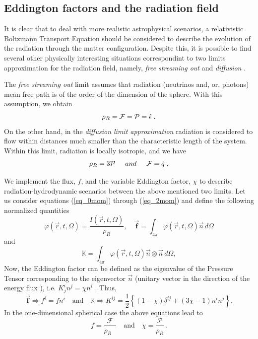 \documentclass[notitlepage,letterpaper, 10pt]{article}
\begin{document}
\subsection{Eddington factors and the radiation field}
It is clear that to deal with more realistic astrophysical scenarios, a relativistic Boltzmann Transport Equation should be considered to describe the evolution of the radiation through the matter configuration\cite{Lindquist1966}.  Despite this, it is possible to find several other physically interesting situations correspondint to two limits approximation for the radiation field, namely, {\em free streaming out} and {\em diffusion} \cite{MihalasMihalas1984}. 

The {\em free streaming out} limit assumes that radiation (neutrinos and, or, photons) mean free path is of the order of the dimension of the sphere. With this assumption, we obtain
\begin{equation}
\rho_{R} = {\cal F} = {\cal P} = \hat{\epsilon} \; .  \label{free_streaming}
\end{equation}
On the other hand, in the {\em diffusion limit approximation} radiation is considered to flow within distances much smaller than the characteristic length of the system. Within this limit, radiation is locally isotropic, and we have 
\begin{equation}
\rho_{R} = 3 {\cal P} \hspace{.5cm} and \hspace{.5cm} {\cal F} = {\hat{q}}
\; .  \label{diffusio_appox}
\end{equation}

We implement the flux, $f$, and the variable Eddington factor, $\chi$ to describe radiation-hydrodynamic scenarios between the above mentioned two limits. Let us consider equations (\ref{eq_0mom}) through (\ref{eq_2mom}) and define the following normalized quantities 
\begin{equation}
\varphi(\vec{r},t,\Omega) = \frac{I(\vec{r},t, \Omega)}{\rho_{R}}, \quad \mathbf{\vec{f}}=\int_{4\pi}\varphi(\vec{r},t,\Omega)\vec{n}\, d\Omega   \label{normalizequantities1}%
\end{equation}
and
\begin{equation}
 \mathbb{K}=\int_{4\pi}\varphi(\vec{r},t,\Omega)\vec{n}\otimes\vec{n}\,d\Omega, \label{normalizequantities2}%
\end{equation}
Now, the Eddington factor can be defined as the eigenvalue of the Pressure Tensor corresponding to the eigenvector $\vec{n}$ (unitary vector in the direction of the energy flux ), i.e. $K_{j}^{i}n^{j}=\chi n^{i}$ \cite{AnilePennisiSammartino1991}. Thus,
\begin{equation}
\mathbf{\vec{f}} \Rightarrow f^{i}=fn^{i} \quad \text{and} \quad \mathbb{K\Rightarrow} K^{ij} = 
\frac{1}{2}\left\{  (1-\chi)\delta^{ij}+(3\chi-1)n^{i}n^{j}\right\}. \label{EddingtonAnile1}%
\end{equation}
In the one-dimensional spherical case the above equations lead to%
\begin{equation}
f=\frac{\mathcal{F}}{\rho_{R}\text{ }}\mathrm{\quad}\text{and}\mathrm{\quad
}\mathcal{\chi}=\frac{\mathcal{P}}{\rho_{R}}\, . \label{EddingtonAnile2}%
\end{equation}
\end{document}

